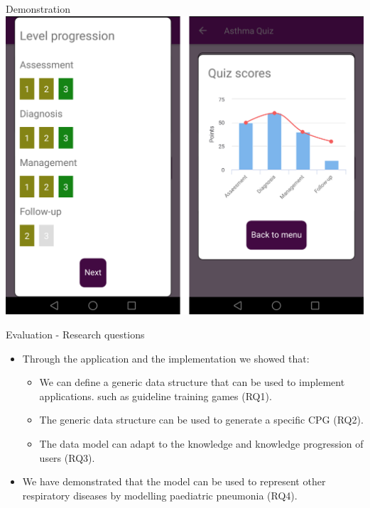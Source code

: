 \documentclass{beamer}
\begin{document}
\begin{frame}{Demonstration}
\includegraphics[scale=0.16]{Montage6}
\end{frame}

\begin{frame}{Evaluation - Research questions}
\begin{itemize}
	\item Through the application and the implementation we showed that:
	\begin{itemize}
		\item We can define a generic data structure that can be used to implement applications. such as guideline training games (RQ1).
		\item The generic data structure can be used to generate a specific CPG (RQ2).
		\item The data model can adapt to the knowledge and knowledge progression of users (RQ3).
	\end{itemize}

	\item We have demonstrated that the model can be used to represent other respiratory diseases by modelling paediatric pneumonia (RQ4).
\end{itemize}
\end{frame}
\end{document}
